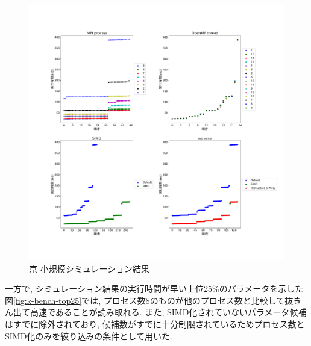 \begin{figure}[htb]
\begin{center}
    \includegraphics[width=14cm]{./images/k-bench.pdf}
    \caption{京 小規模シミュレーション結果}
    \label{fig:k-bench}
\end{center}
\end{figure}
\clearpage
一方で, シミュレーション結果の実行時間が早い上位25\%のパラメータを示した図\ref{fig:k-bench-top25}では,
プロセス数8のものが他のプロセス数と比較して抜きん出て高速であることが読み取れる.
また, SIMD化されていないパラメータ候補はすでに除外されており,
候補数がすでに十分制限されているためプロセス数とSIMD化のみを絞り込みの条件として用いた.\\


